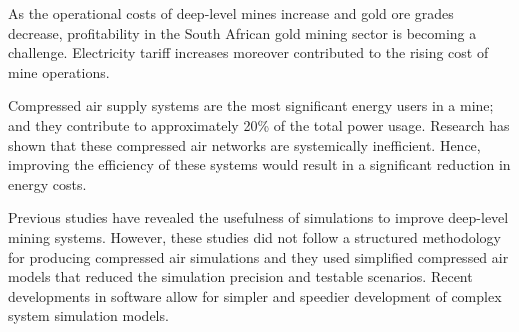 \documentclass[12pt, english, oneside]{report}%
\begin{document}
As the operational costs of deep-level mines increase and gold ore grades decrease, profitability in the South African gold mining sector is becoming a challenge. Electricity tariff increases moreover contributed to the rising cost of mine operations.

	 \par
Compressed air supply systems are the most significant energy users in a mine; and they contribute to approximately 20\% of the total power usage. Research has shown that these compressed air networks are systemically inefficient. Hence, improving the efficiency of these systems would result in a significant reduction in energy costs.
	 \par
Previous studies have revealed the usefulness of simulations to improve deep-level mining systems. However, these studies did not follow a structured methodology for producing compressed air simulations and they used simplified compressed air models that reduced the simulation precision and testable scenarios. Recent developments in software allow for simpler and speedier development of complex system simulation models.
\end{document}
